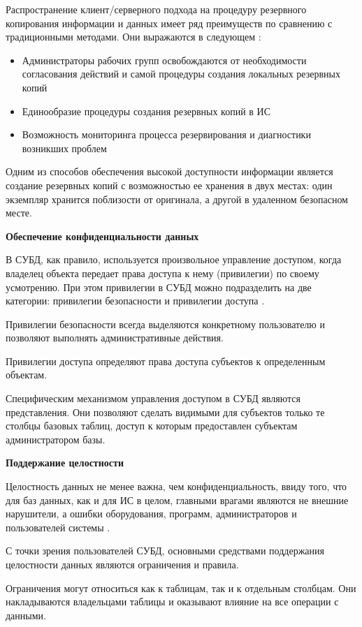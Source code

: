 Распространение клиент/серверного подхода на процедуру резервного копирования информации и данных
имеет ряд преимуществ по сравнению с традиционными методами. Они выражаются в следующем \autocite{DistrDBThreats}:
\begin{itemize}
    \item Администраторы рабочих групп освобождаются от необходимости согласования действий
    и самой процедуры создания локальных резервных копий
    \item Единообразие процедуры создания резервных копий в ИС
    \item Возможность мониторинга процесса резервирования и диагностики возникших проблем
\end{itemize}

Одним из способов обеспечения высокой доступности информации является создание резервных копий с возможностью
ее хранения в двух местах: один экземпляр хранится поблизости от оригинала, а другой в удаленном безопасном месте.


\bigbreak
\textbf{Обеспечение конфиденциальности данных}

В СУБД, как правило, используется произвольное управление доступом, когда владелец объекта передает
права доступа к нему (привилегии) по своему усмотрению. При этом привилегии в СУБД можно подразделить на две
категории: привилегии безопасности и привилегии доступа \autocite{DistrDBThreats}.

Привилегии безопасности всегда выделяются конкретному пользователю и позволяют выполнять административные действия.

Привилегии доступа определяют права доступа субъектов к определенным объектам.

Специфическим механизмом управления доступом в СУБД являются представления. Они позволяют сделать
видимыми для субъектов только те столбцы базовых таблиц, доступ к которым предоставлен субъектам администратором базы.

\bigbreak
\textbf{Поддержание целостности}

Целостность данных не менее важна, чем конфиденциальность, ввиду того, что для баз данных, как и для
ИС в целом, главными врагами являются не внешние нарушители, а ошибки оборудования, программ, администраторов и
пользователей системы \autocite{DistrDBThreats}.

С точки зрения пользователей СУБД, основными средствами поддержания целостности данных являются ограничения и правила.

Ограничения могут относиться как к таблицам, так и к отдельным столбцам. Они накладываются владельцами
таблицы и оказывают влияние на все операции с данными.

